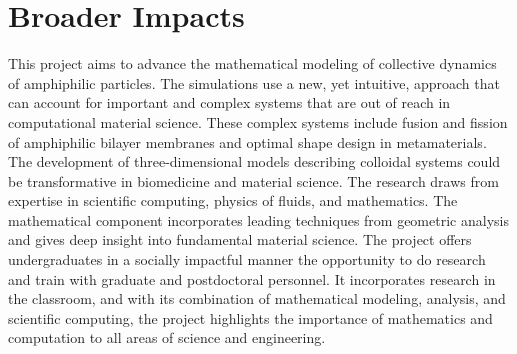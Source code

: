 \section{Broader Impacts}
\label{sec:BroaderImpacts}

This project aims to advance the mathematical modeling of collective 
dynamics of amphiphilic particles. The simulations use a new, yet intuitive,
approach that can account for important and complex systems that are out of 
reach in computational material science. These complex systems include 
fusion and fission of amphiphilic bilayer membranes and optimal shape design
in metamaterials. The development of three-dimensional 
models describing colloidal systems could be transformative in biomedicine
and material science. The research draws from expertise in scientific 
computing, physics of fluids, and mathematics. The mathematical component 
incorporates leading techniques from geometric analysis and gives deep insight 
into fundamental material science. The project offers undergraduates 
in a socially impactful manner the opportunity to do research and train 
with graduate and postdoctoral personnel. It incorporates research in the 
classroom, and with its combination of mathematical modeling, analysis, 
and scientific computing, the project highlights the importance of 
mathematics and computation to all areas of science and engineering.


